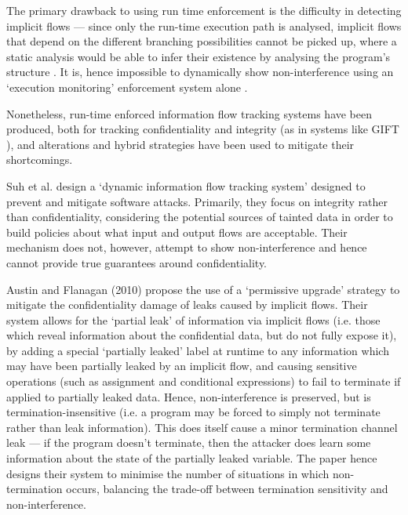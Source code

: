 The primary drawback to using run time enforcement is the difficulty in detecting implicit flows \cite{sabelfeld2003if} --- since only the run-time execution path is analysed, implicit flows that depend on the different branching possibilities cannot be picked up, where a static analysis would be able to infer their existence by analysing the program's structure \cite{venkatakrishnan2006runtime}. It is, hence impossible to dynamically show non-interference using an `execution monitoring' enforcement system alone \cite{schneider2000executionmonitoring}.

Nonetheless, run-time enforced information flow tracking systems have been produced, both for tracking confidentiality and integrity (as in systems like GIFT \cite{lam2006dynamicintegrity}), and alterations and hybrid strategies have been used to mitigate their shortcomings.

Suh et al. \cite{suh2004dynamicintegrity} design a `dynamic information flow tracking system' designed to prevent and mitigate software attacks. Primarily, they focus on integrity rather than confidentiality, considering the potential sources of tainted data in order to build policies about what input and output flows are acceptable. Their mechanism does not, however, attempt to show non-interference and hence cannot provide true guarantees around confidentiality.

Austin and Flanagan (2010) \cite{austin2010runtime} propose the use of a `permissive upgrade' strategy to mitigate the confidentiality damage of leaks caused by implicit flows. Their system allows for the `partial leak' of information via implicit flows (i.e. those which reveal information about the confidential data, but do not fully expose it), by adding a special `partially leaked' label at runtime to any information which may have been partially leaked by an implicit flow, and causing sensitive operations (such as assignment and conditional expressions) to fail to terminate if applied to partially leaked data. Hence, non-interference is preserved, but is termination-insensitive (i.e. a program may be forced to simply not terminate rather than leak information). This does itself cause a minor termination channel leak --- if the program doesn't terminate, then the attacker does learn some information about the state of the partially leaked variable. The paper hence designs their system to minimise the number of situations in which non-termination occurs, balancing the trade-off between termination sensitivity and non-interference.

